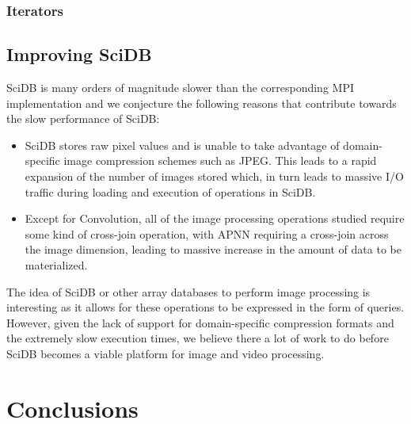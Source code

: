 \documentclass[tog]{acmsiggraph}
\begin{document}
\subsubsection{Iterators}

\subsection{Improving SciDB}
SciDB is many orders of magnitude slower than the corresponding MPI implementation and we conjecture the following reasons that contribute towards the slow performance of SciDB:

\begin{itemize}
\item SciDB stores raw pixel values and is unable to take advantage of domain-specific image compression schemes such as JPEG. This leads to a rapid expansion of the number of images stored which, in turn leads to massive I/O traffic during loading and execution of operations in SciDB.
\item Except for Convolution, all of the image processing operations studied require some kind of cross-join operation, with APNN requiring a cross-join across the image dimension, leading to massive increase in the amount of data to be materialized. 
\end{itemize} 

The idea of SciDB or other array databases to perform image processing is interesting as it allows for these operations to be expressed in the form of queries. However, given the lack of support for domain-specific compression formats and the extremely slow execution times, we believe there a lot of work to do before SciDB becomes a viable platform for image and video processing. 
\section{Conclusions}


\nocite{*}

\end{document}
